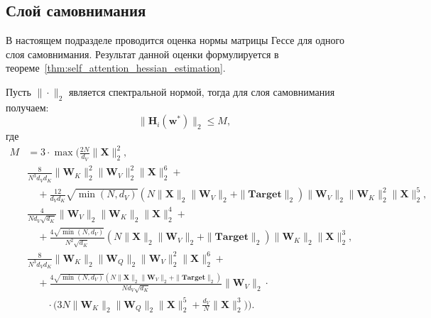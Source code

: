 \subsection{Слой самовнимания}

В настоящем подразделе проводится оценка нормы матрицы Гессе для одного слоя самовнимания. Результат данной оценки формулируется в теореме~\ref{thm:self_attention_hessian_estimation}.

\begin{theorem}\label{thm:self_attention_hessian_estimation}

Пусть $\|\cdot\|_2$ является спектральной нормой, тогда для слоя самовнимания получаем:
\[
    \|\mathbf{H}_i(\mathbf{w}^*)\|_2 \leq M,
\]
где
\begin{align}
M &= 3\cdot\max \Bigg(\frac{2N}{d_V} \| \mathbf{X}\|^2_2, \\
    &\frac{8}{N^3 d_V d_K} \| \mathbf{W}_K\|_2^2 \| \mathbf{W}_V\|^2_2 \| \mathbf{X}\|^6_2 + \\
    &\quad+\frac{12}{d_V d_K} \sqrt{\min(N, d_V)} (N \|\mathbf{X}\|_2 \|\mathbf{W}_V \|_2 + \|\textbf{Target}\|_2) \| \mathbf{W}_V \|_2 \| \mathbf{W}_K\|^2_2 \| \mathbf{X}\|^5_2, \\
    &\frac{4}{N d_V \sqrt{d_K}} \| \mathbf{W}_V\|_2 \| \mathbf{W}_K \|_2 \| \mathbf{X}\|^4_2 +\\
    &\quad+\frac{4\sqrt{\min(N, d_V)}}{N^2\sqrt{d_K}} (N \|\mathbf{X}\|_2 \|\mathbf{W}_V \|_2 + \|\textbf{Target}\|_2) \|\mathbf{W}_K\|_2 \|\mathbf{X}\|^3_2,\\
    &\frac{8}{N^3 d_V d_K} \|\mathbf{W}_K\|_2 \|\mathbf{W}_Q\|_2 \| \mathbf{W}_V\|^2_2 \|\mathbf{X} \|^6_2 + \\
    &\quad+\frac{4\sqrt{\min(N, d_V)} (N \|\mathbf{X}\|_2 \|\mathbf{W}_V \|_2 + \|\textbf{Target}\|_2)}{N d_V \sqrt{d_K}} \|\mathbf{W}_V\|_2 \cdot\\
    &\quad\quad\cdot\Big(3N \|\mathbf{W}_K\|_2 \|\mathbf{W}_Q\|_2 \| \mathbf{X}\|^5_2 + \frac{d_V}{N} \|\mathbf{X}\|^3_2\Big)\Bigg).
\end{align}
\end{theorem}
